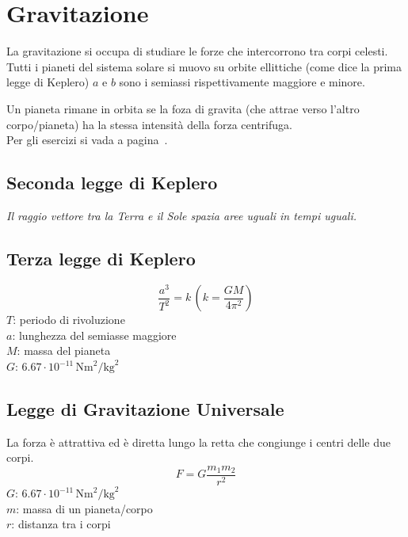 
\section{Gravitazione}\label{sec:gravitazione}
La gravitazione si occupa di studiare le forze che intercorrono tra corpi celesti.\\ 
Tutti i pianeti del sistema solare si muovo su orbite ellittiche (come dice la prima legge di 
Keplero) $a$ e $b$ sono i semiassi rispettivamente maggiore e minore.
\begin{center}
\end{center}
Un pianeta rimane in orbita se la foza di gravita (che attrae verso l'altro corpo/pianeta) ha la 
stessa intensità della forza centrifuga.\\
Per gli esercizi si vada a pagina~\pageref{ex:gravitazione}.

\subsection{Seconda legge di Keplero}
\textit{Il raggio vettore tra la Terra e il Sole spazia aree uguali in tempi uguali.}

\subsection{Terza legge di Keplero}
\begin{equation*}
  \frac{a^3}{T^2} = k\,\left(k = \frac{GM}{4\pi^2}\right)
\end{equation*}
$T$: periodo di rivoluzione\\
$a$: lunghezza del semiasse maggiore\\
$M$: massa del pianeta\\
\hyperref[tab:G]{$G$}: $6.67\cdot10^{-11}\,\text{Nm}^2\text{/kg}^2$

\subsection{Legge di Gravitazione Universale}
La forza è attrattiva ed è diretta lungo la retta che congiunge i centri delle due corpi.
\begin{equation*}
  F = G\frac{m_1m_2}{r^2}
\end{equation*}
\hyperref[tab:G]{$G$}: $6.67\cdot10^{-11}\,\text{Nm}^2\text{/kg}^2$\\
$m$: massa di un pianeta/corpo\\
$r$: distanza tra i corpi

